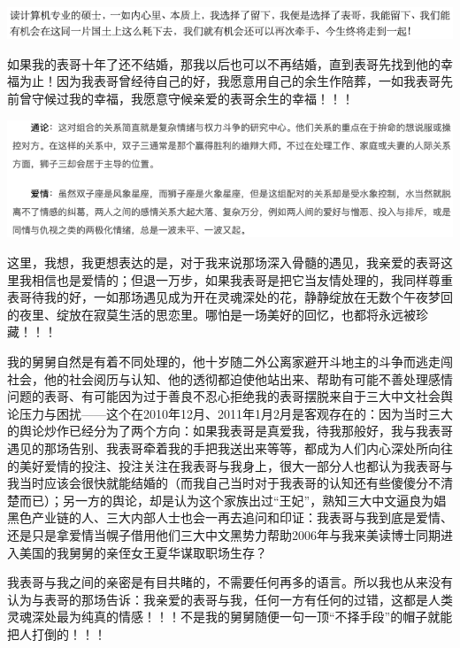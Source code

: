 \documentclass[9pt, b5paper]{article}
\begin{document}
\begin{center}
\includegraphics[width=.9\linewidth]{./pic/readme_20210516_102713.png}
\end{center}

如果我的表哥十年了还不结婚，那我以后也可以不再结婚，直到表哥先找到他的幸福为止！因为我表哥曾经待自己的好，我愿意用自己的余生作陪葬，一如我表哥先前曾守候过我的幸福，我愿意守候亲爱的表哥余生的幸福！！！

\begin{center}
\includegraphics[width=.9\linewidth]{./pic/readme_20210515_095559.png}
\end{center}

这里，我想，我更想表达的是，对于我来说那场深入骨髓的遇见，我亲爱的表哥这里我相信也是爱情的；但退一万步，如果我表哥是把它当友情处理的，我同样尊重表哥待我的好，一如那场遇见成为开在灵魂深处的花，静静绽放在无数个午夜梦回的夜里、绽放在寂莫生活的思恋里。哪怕是一场美好的回忆，也都将永远被珍藏！！！

我的舅舅自然是有着不同处理的，他十岁随二外公离家避开斗地主的斗争而逃走闯社会，他的社会阅历与认知、他的透彻都迫使他站出来、帮助有可能不善处理感情问题的表哥、有可能因为过于善良不忍心拒绝我的表哥摆脱来自于三大中文社会舆论压力与困扰——这个在2010年12月、2011年1月2月是客观存在的：因为当时三大的舆论炒作已经分为了两个方向：如果我表哥是真爱我，待我那般好，我与我表哥遇见的那场告别、我表哥牵着我的手把我送出来等等，都成为人们内心深处所向往的美好爱情的投注、投注关注在我表哥与我身上，很大一部分人也都认为我表哥与我当时应该会很快就能结婚的（而我自己当时对于我表哥的认知还有些傻傻分不清楚而已）；另一方的舆论，却是认为这个家族出过“王妃”，熟知三大中文逼良为娼黑色产业链的人、三大内部人士也会一再去追问和印证：我表哥与我到底是爱情、还是只是拿爱情当幌子借用他们三大中文黑势力帮助2006年与我来美读博士同期进入美国的我舅舅的亲侄女王夏华谋取职场生存？

我表哥与我之间的亲密是有目共睹的，不需要任何再多的语言。所以我也从来没有认为与表哥的那场告诉：我亲爱的表哥与我，任何一方有任何的过错，这都是人类灵魂深处最为纯真的情感！！！不是我的舅舅随便一句一顶“不择手段”的帽子就能把人打倒的！！！
\end{document}
